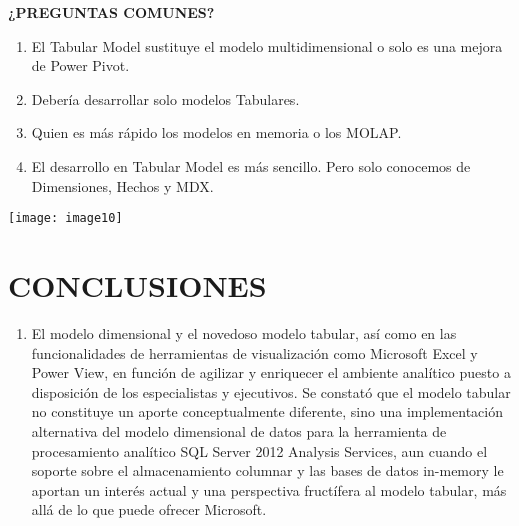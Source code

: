 \documentclass{article} %
\begin{document}
\noindent 

\noindent \textbf{¿PREGUNTAS COMUNES?}

\noindent 

\begin{enumerate}
\item  El Tabular Model sustituye el modelo multidimensional o solo es una mejora de Power Pivot.

\item  Deber\'{i}a desarrollar solo modelos Tabulares.

\item  Quien es m\'{a}s r\'{a}pido los modelos en memoria o los MOLAP.

\item  El desarrollo en Tabular Model es m\'{a}s sencillo. Pero solo conocemos de Dimensiones, Hechos y MDX.
\end{enumerate}

\noindent 

\noindent \texttt{[image: image10]}

\noindent 

\noindent 

\noindent 

\noindent 

\noindent 

\noindent 

\noindent 

\noindent 

\noindent 

\noindent 

\noindent 

\noindent 

\noindent 

\noindent 

\noindent 

\noindent 
\section{CONCLUSIONES}

\noindent 

\begin{enumerate}
\item  El modelo dimensional y el novedoso modelo tabular, as\'{i} como en las funcionalidades de herramientas de visualizaci\'{o}n como Microsoft Excel y Power View, en funci\'{o}n de agilizar y enriquecer el ambiente anal\'{i}tico puesto a disposici\'{o}n de los especialistas y ejecutivos. Se constat\'{o} que el modelo tabular no constituye un aporte conceptualmente diferente, sino una implementaci\'{o}n alternativa del modelo dimensional de datos para la herramienta de procesamiento anal\'{i}tico SQL Server 2012 Analysis Services, aun cuando el soporte sobre el almacenamiento columnar y las bases de datos in-memory le aportan un inter\'{e}s actual y una perspectiva fruct\'{i}fera al modelo tabular, m\'{a}s all\'{a} de lo que puede ofrecer Microsoft.
\end{enumerate}
\end{document}
